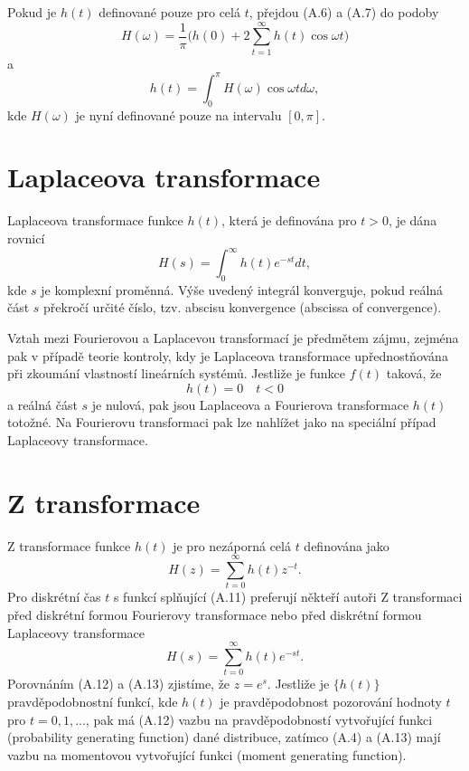 Pokud je $h(t)$ definované pouze pro celá $t$, přejdou (A.6) a (A.7) do podoby
\begin{equation}
H(\omega) = \frac{1}{\pi}\Big(h(0) + 2 \sum_{t = 1}^{\infty} h(t) \cos \omega t \Big)
\end{equation}
a
\begin{equation}
h(t) = \int_0^{\pi} H(\omega) \cos \omega t d \omega,
\end{equation}
kde $H(\omega)$ je nyní definované pouze na intervalu $[0, \pi]$.

\section{Laplaceova transformace}

Laplaceova transformace funkce $h(t)$, která je definována pro $t > 0$, je dána rovnicí
\begin{equation}
H(s) = \int_0^{\infty} h(t)e^{-st}dt,
\end{equation}
kde $s$ je komplexní proměnná. Výše uvedený integrál konverguje, pokud reálná část $s$ překročí určité číslo, tzv. abscisu konvergence (abscissa of convergence).

Vztah mezi Fourierovou a Laplacevou transformací je předmětem zájmu, zejména pak v případě teorie kontroly, kdy je Laplaceova transformace upřednostňována při zkoumání vlastností lineárních systémů. Jestliže je funkce $f(t)$ taková, že
\begin{equation}
h(t) = 0 \quad t < 0
\end{equation}
a reálná část $s$ je nulová, pak jsou Laplaceova a Fourierova transformace $h(t)$ totožné. Na Fourierovu transformaci pak lze nahlížet jako na speciální případ Laplaceovy transformace.

\section{Z transformace}

Z transformace funkce $h(t)$ je pro nezáporná celá $t$ definována jako
\begin{equation}
H(z) = \sum_{t = 0}^{\infty} h(t) z^{-t}.
\end{equation}
Pro diskrétní čas $t$ s funkcí splňující (A.11) preferují někteří autoři Z transformaci před diskrétní formou Fourierovy transformace nebo před diskrétní formou Laplaceovy transformace
\begin{equation}
H(s) = \sum_{t = 0} ^{\infty} h(t) e^{-s t}.
\end{equation}
Porovnáním (A.12) a (A.13) zjistíme, že $z = e^s$. Jestliže je $\{h(t)\}$ pravděpodobnostní funkcí, kde $h(t)$ je pravděpodobnost pozorování hodnoty $t$ pro $t = 0, 1, ...$, pak má (A.12) vazbu na pravděpodobností vytvořující funkci (probability generating function) dané distribuce, zatímco (A.4) a (A.13) mají vazbu na momentovou vytvořující funkci (moment generating function).